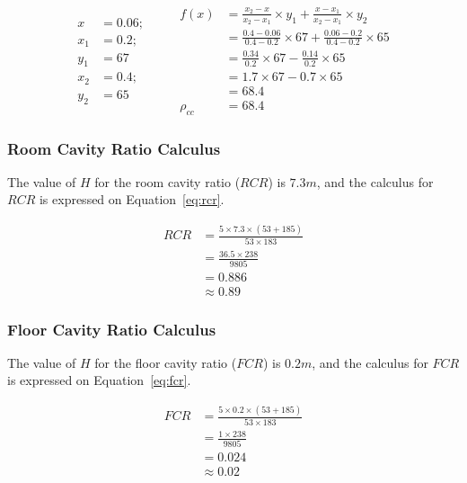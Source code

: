 \begin{equation}
\begin{split}
x &= 0.06; \\
x_1 &= 0.2; \\ y_1 &= 67 \\
x_2 &= 0.4; \\ y_2 &= 65
\end{split}
\qquad
\begin{split}
f(x) &= \frac{x_2 - x}{x_2 - x_1} \times y_1 +
       \frac{x - x_1}{x_2 - x_1} \times y_2 \\
 &= \frac{0.4 - 0.06}{0.4 - 0.2} \times 67 +
    \frac{0.06 - 0.2}{0.4 - 0.2} \times 65 \\
 &= \frac{0.34}{0.2} \times 67 -
    \frac{0.14}{0.2} \times 65 \\
 & = 1.7 \times 67 - 0.7 \times 65 \\
 & = 68.4 \\
\rho_{cc} & = 68.4
\end{split}
\label{eq:reflectance_cc}
\end{equation}

\subsubsection{Room Cavity Ratio Calculus}
The value of $H$ for the room cavity ratio ($RCR$) is $7.3m$, and the calculus for $RCR$ is expressed on Equation~\ref{eq:rcr}.

\begin{equation}
\begin{split}
RCR & = \frac{5 \times 7.3 \times (53 + 185)}{53 \times 183} \\
 & = \frac{36.5 \times 238}{9805} \\
 & = 0.886 \\
 & \approx 0.89
\end{split}
\label{eq:rcr}
\end{equation}

\subsubsection{Floor Cavity Ratio Calculus}
The value of $H$ for the floor cavity ratio ($FCR$) is $0.2m$, and the calculus for $FCR$ is expressed on Equation~\ref{eq:fcr}.

\begin{equation}
\begin{split}
FCR & = \frac{5 \times 0.2 \times (53 + 185)}{53 \times 183} \\
 & = \frac{1 \times 238}{9805} \\
 & = 0.024 \\
 & \approx 0.02
\end{split}
\label{eq:fcr}
\end{equation}

